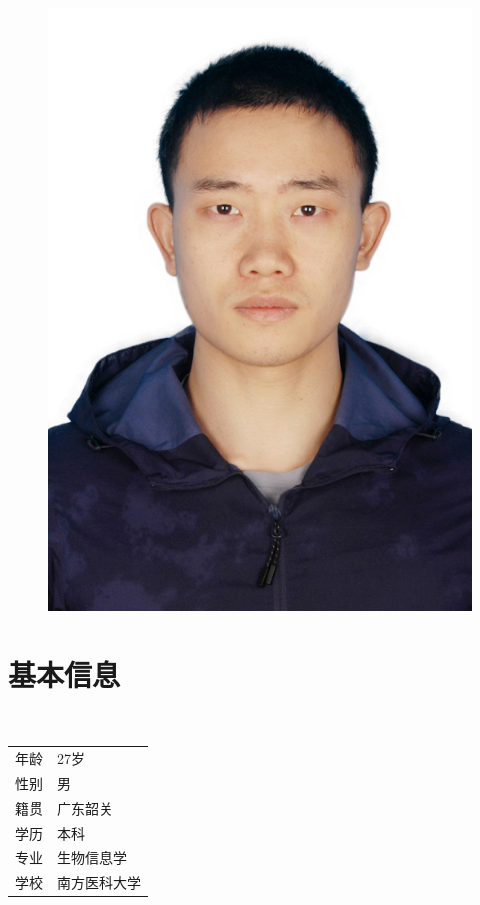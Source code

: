 \documentclass[a4paper]{friggeri-cv_reccius-experiment}
\begin{document}
\begin{aside}
    ~

\vspace{-3.5cm}
\begin{figure}[ht]
	\hspace{0.3cm}
	\includegraphics[width=.71\linewidth]{img/Photo1.jpg}
\end{figure}

\newcommand{\skillspace}{\vspace*{-0.75mm}}
  \vspace{-2.9mm}
  \section{基本信息}\\
  \vspace{3.5mm}
  \begin{tabular}{r@{: }l}
      年龄 & 27岁 \\
      性别 & 男 \\
      籍贯 & 广东韶关 \\
      学历 & 本科 \\
      专业 & 生物信息学 \\
      学校 & 南方医科大学
  \end{tabular}

\end{aside}
\end{document}
